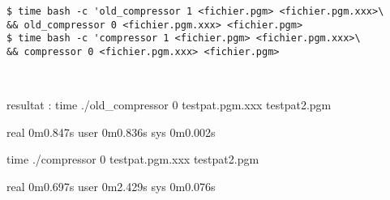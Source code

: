 \documentclass[10pt,a4paper]{report}
\newenvironment{DDbox}[1]{
\begin{lrbox}{\BBbox}\begin{minipage}{\linewidth}}
{\end{minipage}\end{lrbox}\noindent\colorbox{Zgris}{\usebox{\BBbox}} \\
[.5cm]}
\begin{document}
\begin{DDbox}{\linewidth}
\begin{verbatim}
$ time bash -c 'old_compressor 1 <fichier.pgm> <fichier.pgm.xxx>\ 
&& old_compressor 0 <fichier.pgm.xxx> <fichier.pgm>
$ time bash -c 'compressor 1 <fichier.pgm> <fichier.pgm.xxx>\ 
&& compressor 0 <fichier.pgm.xxx> <fichier.pgm>
\end{verbatim}
\end{DDbox}

resultat :
time ./old_compressor 0 testpat.pgm.xxx testpat2.pgm

real	0m0.847s
user	0m0.836s
sys	0m0.002s

time ./compressor 0 testpat.pgm.xxx testpat2.pgm

real	0m0.697s
user	0m2.429s
sys	0m0.076s
\end{document}
